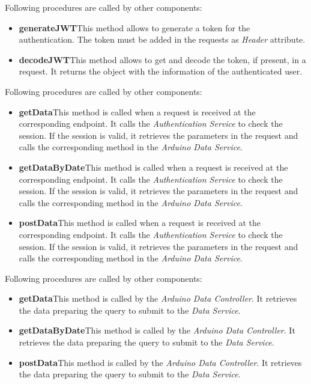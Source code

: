 Following procedures are called by other components:
\begin{itemize}
    \item \textbf{generateJWT}\quad This method allows to generate a token for the authentication. The token must be added in the requests as \textit{Header} attribute.
    \item \textbf{decodeJWT}\quad This method allows to get and decode the token, if present, in a request. It returns the object with the information of the authenticated user.
\end{itemize}

Following procedures are called by other components:
\begin{itemize}
    \item \textbf{getData}\quad This method is called when a request is received at the corresponding endpoint. It calls the \textit{Authentication Service} to check the session. If the session is valid, it retrieves the parameters in the request and calls the corresponding method in the \textit{Arduino Data Service}.
    \item \textbf{getDataByDate}\quad This method is called when a request is received at the corresponding endpoint. It calls the \textit{Authentication Service} to check the session. If the session is valid, it retrieves the parameters in the request and calls the corresponding method in the \textit{Arduino Data Service}.
    \item \textbf{postData}\quad This method is called when a request is received at the corresponding endpoint. It calls the \textit{Authentication Service} to check the session. If the session is valid, it retrieves the parameters in the request and calls the corresponding method in the \textit{Arduino Data Service}.
\end{itemize}

Following procedures are called by other components:
\begin{itemize}
    \item \textbf{getData}\quad This method is called by the \textit{Arduino Data Controller}. It retrieves the data preparing the query to submit to the \textit{Data Service}.
    \item \textbf{getDataByDate}\quad This method is called by the \textit{Arduino Data Controller}. It retrieves the data preparing the query to submit to the \textit{Data Service}.
    \item \textbf{postData}\quad This method is called by the \textit{Arduino Data Controller}. It retrieves the data preparing the query to submit to the \textit{Data Service}.
\end{itemize}

